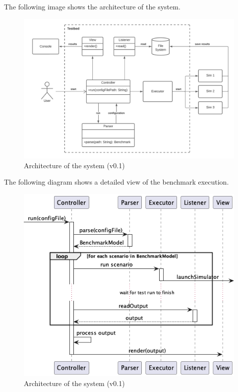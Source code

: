 \documentclass[12pt,a4paper,openright,twoside]{book}
\begin{document}
The following image shows the architecture of the system.

\begin{figure}[ht]
    \centering
    \includegraphics[width=\textwidth]{figures/testbed-architecture.png}
    \caption{Architecture of the system (v0.1)}
    \label{fig:random-image}
\end{figure}

The following diagram shows a detailed view of the benchmark execution.

\begin{figure}[ht]
  \centering
  \includegraphics[width=\textwidth]{figures/execution-sequence-diagram.png}
  \caption{Architecture of the system (v0.1)}
  \label{fig:random-image}
\end{figure}
\end{document}
